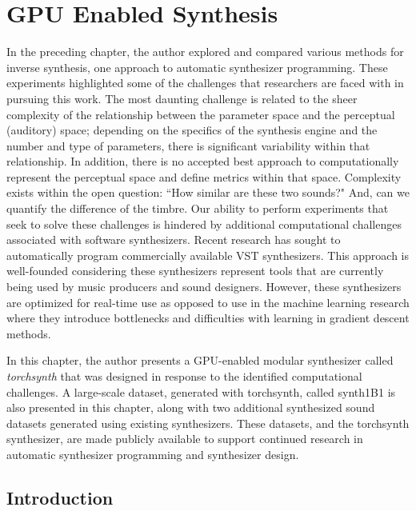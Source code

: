 \graphicspath{{./}{./figures/}{./figures/torchsynth/}}

\chapter{GPU Enabled Synthesis}
\label{chapter:torchsynth}

In the preceding chapter, the author explored and compared various methods for inverse synthesis, one approach to automatic synthesizer programming. These experiments highlighted some of the challenges that researchers are faced with in pursuing this work. The most daunting challenge is related to the sheer complexity of the relationship between the parameter space and the perceptual (auditory) space; depending on the specifics of the synthesis engine and the number and type of parameters, there is significant variability within that relationship. In addition, there is no accepted best approach to computationally represent the perceptual space and define metrics within that space. Complexity exists within the open question:  ``How similar are these two sounds?" And, can we quantify the difference of the timbre. Our ability to perform experiments that seek to solve these challenges is hindered by additional computational challenges associated with software synthesizers. Recent research has sought to automatically program commercially available VST synthesizers. This approach is well-founded considering these synthesizers represent tools that are currently being used by music producers and sound designers. However, these synthesizers are optimized for real-time use as opposed to use in the machine learning research where they introduce bottlenecks \cite{masudo2021quality} and difficulties with learning in gradient descent methods.

In this chapter, the author presents a GPU-enabled modular synthesizer called \textit{torchsynth} that was designed in response to the identified computational challenges. A large-scale dataset, generated with torchsynth, called synth1B1 is also presented in this chapter, along with two additional synthesized sound datasets generated using existing synthesizers. These datasets, and the torchsynth synthesizer, are made publicly available to support continued research in automatic synthesizer programming and synthesizer design.

\section{Introduction}
\label{sec:intro}

